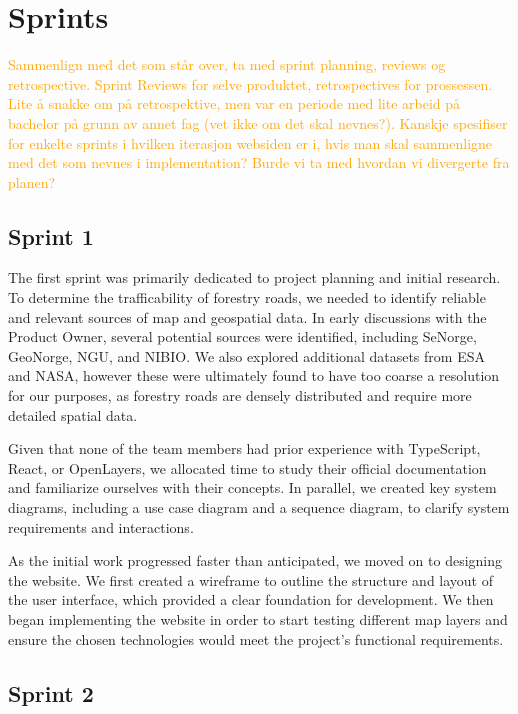 \section{Sprints}

\textcolor{orange}{Sammenlign med det som står over, ta med sprint planning, reviews og retrospective. Sprint Reviews for selve produktet, retrospectives for prossessen. Lite å snakke om på retrospektive, men var en periode med lite arbeid på bachelor på grunn av annet fag (vet ikke om det skal nevnes?). Kanskje spesifiser for enkelte sprints i hvilken iterasjon websiden er i, hvis man skal sammenligne med det som nevnes i implementation? Burde vi ta med hvordan vi divergerte fra planen?}

\subsection{Sprint 1}

The first sprint was primarily dedicated to project planning and initial research.  To determine the trafficability of forestry roads, we needed to identify reliable and relevant sources of map and geospatial data. In early discussions with the Product Owner, several potential sources were identified, including SeNorge, GeoNorge, NGU, and NIBIO. We also explored additional datasets from ESA and NASA, however these were ultimately found to have too coarse a resolution for our purposes, as forestry roads are densely distributed and require more detailed spatial data.

Given that none of the team members had prior experience with TypeScript, React, or OpenLayers, we allocated time to study their official documentation and familiarize ourselves with their concepts. In parallel, we created key system diagrams, including a use case diagram and a sequence diagram, to clarify system requirements and interactions. 

As the initial work progressed faster than anticipated, we moved on to designing the website. We first created a wireframe to outline the structure and layout of the user interface, which provided a clear foundation for development. We then began implementing the website in order to start testing different map layers and ensure the chosen technologies would meet the project’s functional requirements.

\subsection{Sprint 2}

